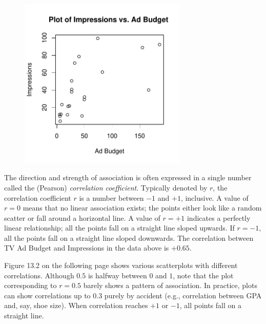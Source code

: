 \documentclass[11pt, chapterprefix=true]{scrbook}\usepackage[]{graphicx}\usepackage[]{color}
\begin{document}
\begin{figure}[ht]
\centering



{\centering \includegraphics[width=8cm]{figure/LBL13a-1} 

}



\end{figure}

The direction and strength of association is often expressed in a single number called the (Pearson) \textit{correlation coefficient}.  Typically denoted by $r$, the correlation coefficient $r$ is a number between $-1$ and $+1$, inclusive.  A value of $r = 0$ means that no linear association exists; the points either look like a random scatter or fall around a horizontal line.  A value of $r = +1$ indicates a perfectly linear relationship; all the points fall on a straight line sloped upwards.  If $r = -1$, all the points fall on a straight line sloped downwards. The correlation between TV Ad Budget and Impressions in the data above is $+0.65$.

Figure 13.2 on the following page shows various scatterplots with different correlations.  Although $0.5$ is halfway between $0$ and $1$, note that the plot corresponding to $r = 0.5$ barely shows a pattern of association.  In practice, plots can show correlations up to $0.3$ purely by accident (e.g., correlation between GPA and, say, shoe size).  When correlation reaches $+1$ or $-1$, all points fall on a straight line.
\end{document}
